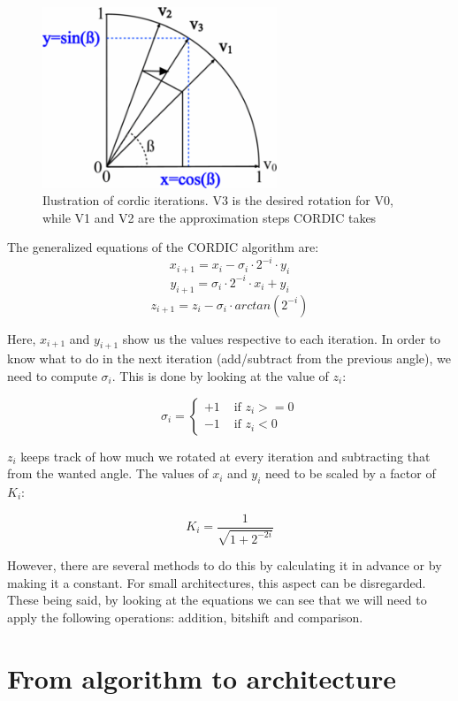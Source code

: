 \documentclass[12pt, a4paper,oneside]{article}
\begin{document}
\begin{figure}[h]
	\centering
	\includegraphics[width = 7cm]{cordic_iterations.png}
	\caption{Ilustration of cordic iterations. V3 is the desired rotation for V0,
	while V1 and V2 are the approximation steps CORDIC takes\cite{cordic2}}
	\label{fig:cordic_iterations}
\end{figure}

The generalized equations of the CORDIC algorithm are:
\[ x_{i+1} = x_i - \sigma_i \cdot 2^{-i} \cdot y_i \]
\[ y_{i+1} = \sigma_i \cdot 2^{-i} \cdot x_i + y_i\]
\[ z_{i+1} = z_i - \sigma_i \cdot arctan(2^{-i}) \]


Here, $x_{i+1}$ and $y_{i+1}$ show us the values respective to each iteration.
In order to know what to do in the next iteration (add/subtract from the previous
angle), we need to compute $\sigma_i$. This is done by looking at the value of 
$z_i$:

$$
\sigma_i = \left\{ \begin{array}{rl}
 +1 &\mbox{ if $z_i>=0$} \\
 -1 &\mbox{ if $z_i<0$}
       \end{array} \right.
$$

$z_i$ keeps track of how much we rotated at every iteration and subtracting that 
from the wanted angle.
The values of $x_i$ and $y_i$ need to be scaled by a factor of $K_i$:

$$K_i = \frac{1}{\sqrt{1 + 2^{-2i}}}$$

However, there are several methods to do this by calculating it in advance or by 
making it a constant. For small architectures, this aspect can be disregarded.
\\
These being said, by looking at the equations we can see that we will need 
to apply the following operations: addition, bitshift and comparison.

\section{From algorithm to architecture}
\end{document}
